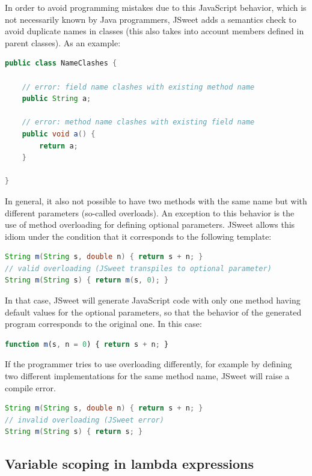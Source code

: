 \documentclass[a4paper]{report}
\begin{document}
In order to avoid programming mistakes due to this JavaScript behavior, which is not necessarily known by Java programmers, JSweet adds a semantics check to avoid duplicate names in classes (this also takes into account members defined in parent classes). As an example:

\begin{lstlisting}[language=Java]
public class NameClashes {

	// error: field name clashes with existing method name
	public String a;

	// error: method name clashes with existing field name
	public void a() {
		return a;
	}

}
\end{lstlisting}

In general, it also not possible to have two methods with the same name but with different parameters (so-called overloads). An exception to this behavior is the use of method overloading for defining optional parameters. JSweet allows this idiom under the condition that it corresponds to the following template:

\begin{lstlisting}[language=Java]
String m(String s, double n) { return s + n; }
// valid overloading (JSweet transpiles to optional parameter)
String m(String s) { return m(s, 0); }
\end{lstlisting}

In that case, JSweet will generate JavaScript code with only one method having default values for the optional parameters, so that the behavior of the generated program corresponds to the original one. In this case:

\begin{lstlisting}[language=JavaScript]
function m(s, n = 0) { return s + n; }
\end{lstlisting}


If the programmer tries to use overloading differently, for example by defining two different implementations for the same method name, JSweet will raise a compile error. 

\begin{lstlisting}[language=Java]
String m(String s, double n) { return s + n; }
// invalid overloading (JSweet error)
String m(String s) { return s; }
\end{lstlisting}


\subsection{Variable scoping in lambda expressions}
\end{document}
